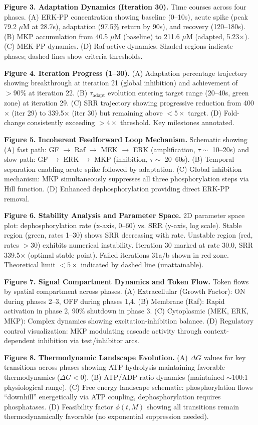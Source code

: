 \documentclass[twocolumn,11pt]{article}
\newcommand{\dg}{\Delta G}
\newcommand{\srr}{\text{SRR}}
\begin{document}
\textbf{Figure 3. Adaptation Dynamics (Iteration 30).}
Time courses across four phases. (A) ERK-PP concentration showing baseline (0--10s), acute spike (peak 79.2 $\mu$M at 28.7s), adaptation (97.5\% return by 90s), and recovery (120--180s). (B) MKP accumulation from 40.5 $\mu$M (baseline) to 211.6 $\mu$M (adapted, 5.23$\times$). (C) MEK-PP dynamics. (D) Raf-active dynamics. Shaded regions indicate phases; dashed lines show criteria thresholds.

\textbf{Figure 4. Iteration Progress (1--30).}
(A) Adaptation percentage trajectory showing breakthrough at iteration 21 (global inhibition) and achievement of $>90\%$ at iteration 22. (B) $\tau_{\text{adapt}}$ evolution entering target range (20--40s, green zone) at iteration 29. (C) SRR trajectory showing progressive reduction from 400$\times$ (iter 29) to 339.5$\times$ (iter 30) but remaining above $<5\times$ target. (D) Fold-change consistently exceeding $>4\times$ threshold. Key milestones annotated.

\textbf{Figure 5. Incoherent Feedforward Loop Mechanism.}
Schematic showing (A) fast path: GF $\to$ Raf $\to$ MEK $\to$ ERK (amplification, $\tau \sim$ 10--20s) and slow path: GF $\to$ ERK $\to$ MKP (inhibition, $\tau \sim$ 20--60s). (B) Temporal separation enabling acute spike followed by adaptation. (C) Global inhibition mechanism: MKP simultaneously suppresses all three phosphorylation steps via Hill function. (D) Enhanced dephosphorylation providing direct ERK-PP removal.

\textbf{Figure 6. Stability Analysis and Parameter Space.}
2D parameter space plot: dephosphorylation rate (x-axis, 0--60) vs. SRR (y-axis, log scale). Stable region (green, rates 1--30) shows SRR decreasing with rate. Unstable region (red, rates $>30$) exhibits numerical instability. Iteration 30 marked at rate 30.0, SRR 339.5$\times$ (optimal stable point). Failed iterations 31a/b shown in red zone. Theoretical limit \srr{} $<5\times$ indicated by dashed line (unattainable).

\textbf{Figure 7. Signal Compartment Dynamics and Token Flow.}
Token flows by spatial compartment across phases. (A) Extracellular (Growth Factor): ON during phases 2--3, OFF during phases 1,4. (B) Membrane (Raf): Rapid activation in phase 2, 90\% shutdown in phase 3. (C) Cytoplasmic (MEK, ERK, MKP): Complex dynamics showing excitation-inhibition balance. (D) Regulatory control visualization: MKP modulating cascade activity through context-dependent inhibition via test/inhibitor arcs.

\textbf{Figure 8. Thermodynamic Landscape Evolution.}
(A) $\dg{}$ values for key transitions across phases showing ATP hydrolysis maintaining favorable thermodynamics ($\dg{} < 0$). (B) ATP/ADP ratio dynamics (maintained $\sim$100:1 physiological range). (C) Free energy landscape schematic: phosphorylation flows ``downhill'' energetically via ATP coupling, dephosphorylation requires phosphatases. (D) Feasibility factor $\phi(t,M)$ showing all transitions remain thermodynamically favorable (no exponential suppression needed).
\end{document}
